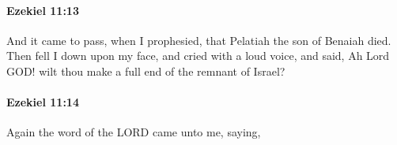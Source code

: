 		\paragraph{Ezekiel 11:13} %
			\label{EZEKIEL-11-13}

			And it came to pass, when I prophesied, that Pelatiah the son of Benaiah died. Then fell I down upon my face, and cried with a loud voice, and said, Ah Lord GOD! wilt thou make a full end of the remnant of Israel?


		\paragraph{Ezekiel 11:14} %
			\label{EZEKIEL-11-14}

			Again the word of the LORD came unto me, saying,


